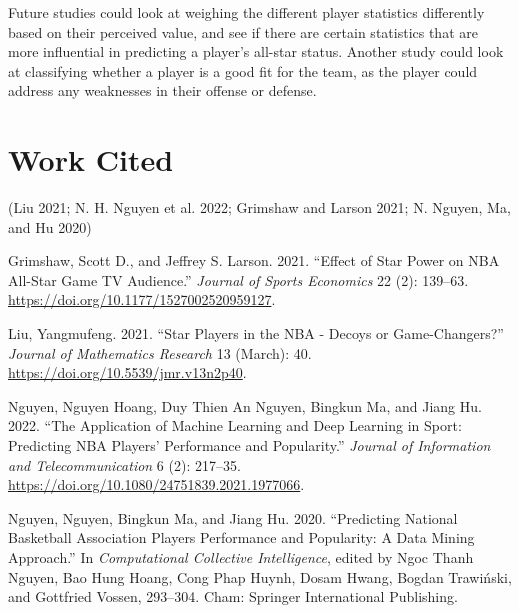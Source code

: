 \documentclass[
]{article}
\newlength{\cslhangindent}
\newlength{\cslentryspacingunit} %
\newenvironment{CSLReferences}[2] %
 {%
  \setlength{\parindent}{0pt}
  \ifodd #1
  \let\oldpar\par
  \def\par{\hangindent=\cslhangindent\oldpar}
  \fi
  \setlength{\parskip}{#2\cslentryspacingunit}
 }%
 {}
\begin{document}
Future studies could look at weighing the different player statistics differently based on their perceived value, and see if there are certain statistics that are more influential in predicting a player's all-star status. Another study could look at classifying whether a player is a good fit for the team, as the player could address any weaknesses in their offense or defense.

\hypertarget{work-cited}{%
\section{Work Cited}\label{work-cited}}

(Liu 2021; N. H. Nguyen et al. 2022; Grimshaw and Larson 2021; N. Nguyen, Ma, and Hu 2020)

\hypertarget{refs}{}
\begin{CSLReferences}{1}{0}
\leavevmode{}%
Grimshaw, Scott D., and Jeffrey S. Larson. 2021. {``Effect of Star Power on NBA All-Star Game TV Audience.''} \emph{Journal of Sports Economics} 22 (2): 139--63. \url{https://doi.org/10.1177/1527002520959127}.

\leavevmode{}%
Liu, Yangmufeng. 2021. {``Star Players in the NBA - Decoys or Game-Changers?''} \emph{Journal of Mathematics Research} 13 (March): 40. \url{https://doi.org/10.5539/jmr.v13n2p40}.

\leavevmode{}%
Nguyen, Nguyen Hoang, Duy Thien An Nguyen, Bingkun Ma, and Jiang Hu. 2022. {``The Application of Machine Learning and Deep Learning in Sport: Predicting NBA Players' Performance and Popularity.''} \emph{Journal of Information and Telecommunication} 6 (2): 217--35. \url{https://doi.org/10.1080/24751839.2021.1977066}.

\leavevmode{}%
Nguyen, Nguyen, Bingkun Ma, and Jiang Hu. 2020. {``Predicting National Basketball Association Players Performance and Popularity: A Data Mining Approach.''} In \emph{Computational Collective Intelligence}, edited by Ngoc Thanh Nguyen, Bao Hung Hoang, Cong Phap Huynh, Dosam Hwang, Bogdan Trawiński, and Gottfried Vossen, 293--304. Cham: Springer International Publishing.

\end{CSLReferences}
\end{document}
